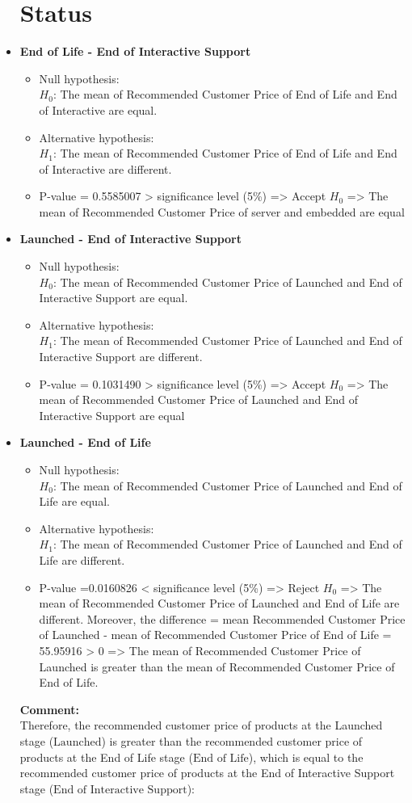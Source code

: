 \documentclass[a4paper]{article}
\begin{document}
\begin{itemize}
		\section*{Status}
		\item \textbf{End of Life - End of Interactive Support}
		\begin{itemize}
			\item Null hypothesis:\\
			\(H_0\): The mean of Recommended Customer Price of End of Life and End of Interactive are equal.
			\item Alternative hypothesis:\\
			\(H_1\): The mean of Recommended Customer Price of End of Life and End of Interactive are different.
			\item P-value = 0.5585007 > significance level (5\%) => Accept \(H_0\) => The mean of Recommended Customer Price of server and embedded are equal
		\end{itemize}
		\item \textbf{Launched - End of Interactive Support}
		\begin{itemize}
			\item Null hypothesis:\\
			\(H_0\): The mean of Recommended Customer Price of Launched and End of Interactive Support are equal.
			\item Alternative hypothesis:\\
			\(H_1\): The mean of Recommended Customer Price of Launched and End of Interactive Support are different.
			\item P-value = 0.1031490 > significance level (5\%) => Accept \(H_0\) => The mean of Recommended Customer Price of Launched and End of Interactive Support are equal
		\end{itemize}
		\item \textbf{Launched - End of Life}
	\begin{itemize}
		\item Null hypothesis:\\
		\(H_0\): The mean of Recommended Customer Price of Launched and End of Life are equal.
		\item Alternative hypothesis:\\
		\(H_1\): The mean of Recommended Customer Price of Launched and End of Life are different.
		\item P-value =0.0160826 < significance level (5\%) => Reject \(H_0\) => The mean of Recommended Customer Price of Launched and End of Life are different. Moreover, the difference = mean Recommended Customer Price of Launched - mean of Recommended Customer Price of End of Life = 55.95916 > 0 => The mean of Recommended Customer Price of Launched is greater than the mean of Recommended Customer Price of End of Life.
	\end{itemize}
	\textbf{Comment:}
	\\
	Therefore, the recommended customer price of products at the Launched stage ($\text{Launched}$) is greater than the recommended customer price of products at the End of Life stage ($\text{End of Life}$), which is equal to the recommended customer price of products at the End of Interactive Support stage ($\text{End of Interactive Support}$):
	

\end{itemize}
\end{document}

